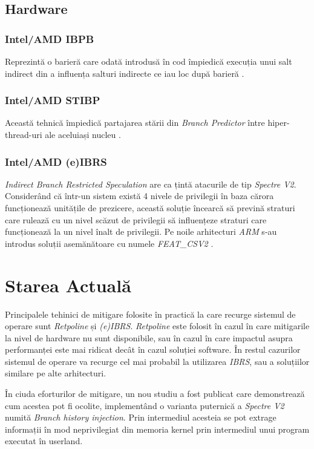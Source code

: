 \subsection{Hardware}

\subsubsection{Intel/AMD IBPB}

Reprezintă o barieră care odată introdusă în cod împiedică execuția unui salt
indirect din a influența salturi indirecte ce iau loc după barieră
\cite{intel_mitigations} \cite{amd_mitigations}.

\subsubsection{Intel/AMD STIBP}

Această tehnică împiedică partajarea stării din \emph{Branch Predictor} între
hiper-thread-uri ale aceluiași nucleu \cite{intel_mitigations}
\cite{amd_mitigations}.

\subsubsection{Intel/AMD (e)IBRS}

\emph{Indirect Branch Restricted Speculation} are ca țintă atacurile de tip
\emph{Spectre V2}. Considerând că într-un sistem există 4 nivele de 
privilegii în baza cărora funcționează unitățile de prezicere, această 
soluție încearcă să prevină straturi care rulează cu un nivel scăzut de 
privilegii să influențeze straturi care funcționează la un nivel înalt de
privilegii. Pe noile arhitecturi \emph{ARM} s-au introdus soluții asemănătoare
cu numele \emph{FEAT\_CSV2} \cite{intel_mitigations} \cite{amd_mitigations}.

\section{Starea Actuală}

Principalele tehinici de mitigare folosite în practică la care recurge sistemul
de operare sunt \emph{Retpoline} și \emph{(e)IBRS}. \emph{Retpoline} este
folosit în cazul în care mitigarile la nivel de hardware nu sunt disponibile,
sau în cazul în care impactul asupra performanței este mai ridicat decât în
cazul soluției software. În restul cazurilor sistemul de operare va recurge 
cel mai probabil la utilizarea \emph{IBRS}, sau a soluțiilor similare pe alte
arhitecturi.

În ciuda eforturilor de mitigare, un nou studiu a fost publicat
\cite{bhi_spectre_2022} care demonstrează cum acestea pot fi ocolite,
implementând o varianta puternică a \emph{Spectre V2} numită \emph{Branch
history injection}. Prin intermediul acesteia se pot extrage informații în mod
neprivilegiat din memoria kernel prin intermediul unui program executat în
userland.
